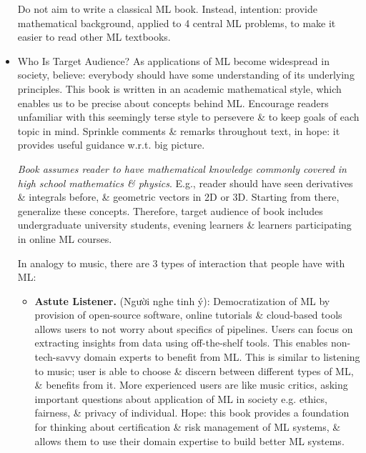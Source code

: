 \documentclass{article}
\begin{document}
\begin{itemize}
	Do not aim to write a classical ML book. Instead, intention: provide mathematical background, applied to 4 central ML problems, to make it easier to read other ML textbooks.
	\item {\sf Who Is Target Audience?} As applications of ML become widespread in society, believe: everybody should have some understanding of its underlying principles. This book is written in an academic mathematical style, which enables us to be precise about concepts behind ML. Encourage readers unfamiliar with this seemingly terse style to persevere \& to keep goals of each topic in mind. Sprinkle comments \& remarks throughout text, in hope: it provides useful guidance w.r.t. big picture.
	
	{\it Book assumes reader to have mathematical knowledge commonly covered in high school mathematics \& physics}. E.g., reader should have seen derivatives \& integrals before, \& geometric vectors in 2D or 3D. Starting from there, generalize these concepts. Therefore, target audience of book includes undergraduate university students, evening learners \& learners participating in online ML courses.
	
	In analogy to music, there are 3 types of interaction that people have with ML:
	\begin{itemize}
		\item {\bf Astute Listener.} (Người nghe tinh ý): Democratization of ML by provision of open-source software, online tutorials \& cloud-based tools allows users to not worry about specifics of pipelines. Users can focus on extracting insights from data using off-the-shelf tools. This enables non-tech-savvy domain experts to benefit from ML. This is similar to listening to music; user is able to choose \& discern between different types of ML, \& benefits from it. More experienced users are like music critics, asking important questions about application of ML in society e.g. ethics, fairness, \& privacy of individual. Hope: this book provides a foundation for thinking about certification \& risk management of ML systems, \& allows them to use their domain expertise to build better ML systems.
		

\end{itemize}
\end{itemize}
\end{document}
